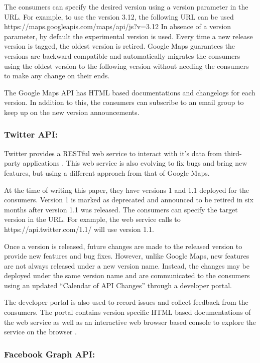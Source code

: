 \documentclass[runningheads,a4paper]{llncs}
\begin{document}
The consumers can specify the desired version using a version parameter in the URL. For example, to use the version 3.12, the following URL can be used https://maps.googleapis.com/maps/api/js?v=3.12 In absence of a version parameter, by default the experimental version is used.
Every time a new release version is tagged, the oldest version is retired. Google Maps guarantees the versions are backward compatible and automatically migrates the consumers using the oldest version to the following version without needing the consumers to make any change on their ends.

The Google Maps API has HTML based documentations and changelogs for each version. In addition to this, the consumers can subscribe to an email group to keep up on the new version announcements.


\subsubsection{Twitter API:}
Twitter provides a RESTful web service to interact with it’s data from third-party applications \cite{twitter_api}. This web service is also evolving to fix bugs and bring new features, but using a different approach from that of Google Maps.

At the time of writing this paper, they have versions 1 and 1.1 deployed for the consumers. Version 1 is marked as deprecated and announced to be retired in six months after version 1.1 was released. The consumers can specify the target version in the URL. For example, the web service calls to https://api.twitter.com/1.1/ will use version 1.1.

Once a version is released, future changes are made to the released version to provide new features and bug fixes. However, unlike Google Maps, new features are not always released under a new version name. Instead, the changes may be deployed under the same version name and are communicated to the consumers using an updated “Calendar of API Changes” \cite{twitter_calendar} through a developer portal.

The developer portal is also used to record issues and collect feedback from the consumers. The portal contains version specific HTML based documentations of the web service as well as an interactive web browser based console to explore the service on the browser \cite{twitter_console} .

\subsubsection{Facebook Graph API:}
\end{document}
